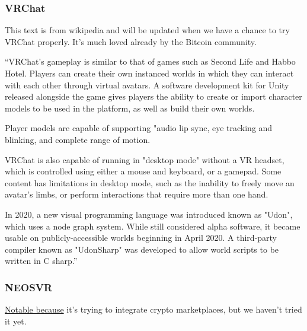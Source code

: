 \subsubsection{VRChat}
This text is from wikipedia and will be updated when we have a chance to try VRChat properly. It's much loved already by the Bitcoin community.\par
``VRChat's gameplay is similar to that of games such as Second Life and Habbo Hotel. Players can create their own instanced worlds in which they can interact with each other through virtual avatars. A software development kit for Unity released alongside the game gives players the ability to create or import character models to be used in the platform, as well as build their own worlds.\par
Player models are capable of supporting "audio lip sync, eye tracking and blinking, and complete range of motion.\par
VRChat is also capable of running in "desktop mode" without a VR headset, which is controlled using either a mouse and keyboard, or a gamepad. Some content has limitations in desktop mode, such as the inability to freely move an avatar's limbs, or perform interactions that require more than one hand.\par
In 2020, a new visual programming language was introduced known as "Udon", which uses a node graph system. While still considered alpha software, it became usable on publicly-accessible worlds beginning in April 2020. A third-party compiler known as "UdonSharp" was developed to allow world scripts to be written in C sharp.'' 
\subsubsection{NEOSVR}
\href{https://neos.com/}{Notable because} it's trying to integrate crypto marketplaces, but we haven't tried it yet.
